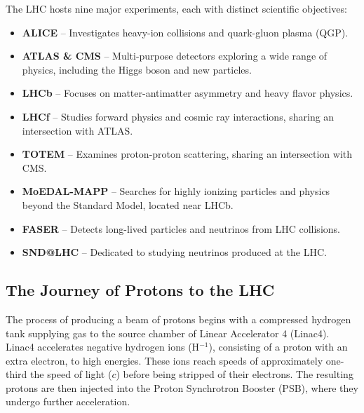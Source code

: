 The LHC hosts nine major experiments, each with distinct scientific objectives:
\begin{itemize}
\item {\bf ALICE} – Investigates heavy-ion collisions and quark-gluon plasma (QGP).
\item {\bf ATLAS \& CMS} – Multi-purpose detectors exploring a wide range of physics, including the Higgs boson and new particles.
\item {\bf LHCb} – Focuses on matter-antimatter asymmetry and heavy flavor physics.
\item {\bf LHCf} – Studies forward physics and cosmic ray interactions, sharing an intersection with ATLAS.
\item {\bf TOTEM} – Examines proton-proton scattering, sharing an intersection with CMS.
\item {\bf MoEDAL-MAPP} – Searches for highly ionizing particles and physics beyond the Standard Model, located near LHCb.
\item {\bf FASER} – Detects long-lived particles and neutrinos from LHC collisions.
\item {\bf SND@LHC} – Dedicated to studying neutrinos produced at the LHC.
\end{itemize}

\subsection{The Journey of Protons to the LHC}
The process of producing a beam of protons begins with a compressed hydrogen tank supplying gas to the source chamber of Linear Accelerator 4 (Linac4). Linac4 accelerates negative hydrogen ions (H$^{-1}$), consisting of a proton with an extra electron, to high energies.
These ions reach speeds of approximately one-third the speed of light ($c$) before being stripped of their electrons. The resulting protons are then injected into the Proton Synchrotron Booster (PSB), where they undergo further acceleration.

